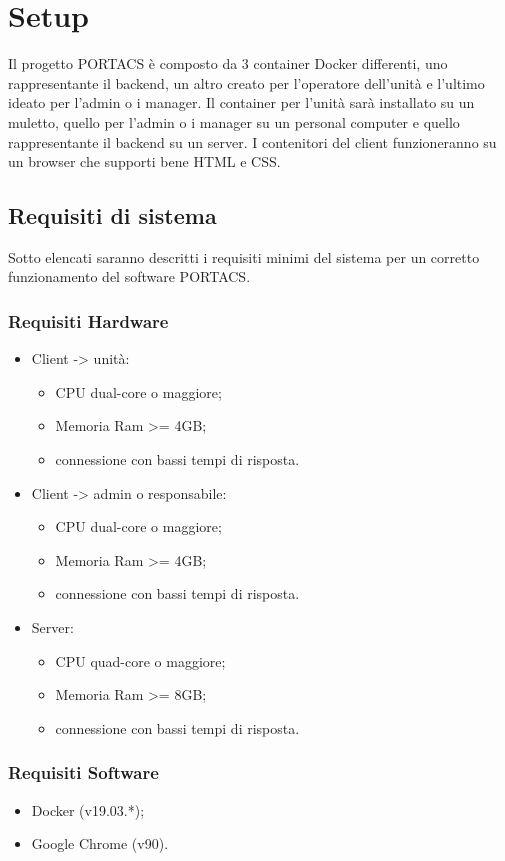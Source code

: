 \section{Setup}
Il progetto PORTACS è composto da 3 container Docker differenti, uno rappresentante il backend, un altro creato per l'operatore dell'unità e l'ultimo ideato per l'admin o i manager. Il container per l'unità sarà installato su un muletto, quello per l'admin o i manager su un personal computer e quello rappresentante il backend su un server. I contenitori del client funzioneranno su un browser che supporti bene HTML e CSS.


\subsection{Requisiti di sistema}
Sotto elencati saranno descritti i requisiti minimi del sistema per un corretto funzionamento del software PORTACS.


\subsubsection{Requisiti Hardware}
\begin{itemize}
	\item Client -> unità:
\begin{itemize}
	\item CPU dual-core o maggiore;
	\item Memoria Ram >= 4GB;
	\item connessione con bassi tempi di risposta.
\end{itemize}
	\item Client -> admin o responsabile:
\begin{itemize}
	\item CPU dual-core o maggiore;
	\item Memoria Ram >= 4GB;
	\item connessione con bassi tempi di risposta.
\end{itemize}
	\item Server:
\begin{itemize}
	\item CPU quad-core o maggiore;
	\item Memoria Ram >= 8GB;
	\item connessione con bassi tempi di risposta.
\end{itemize}
\end{itemize}

\subsubsection{Requisiti Software}
    \begin{itemize}
        \item Docker (v19.03.*);
        \item Google Chrome (v90).
    \end{itemize}

